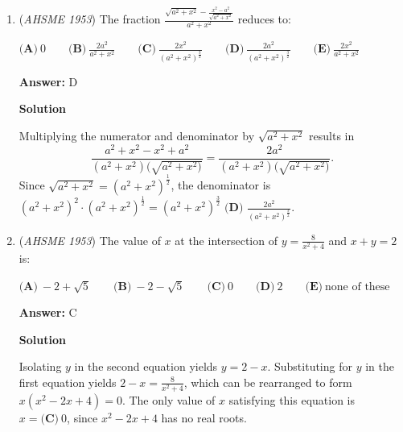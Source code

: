 \begin{enumerate}
 $\textbf{(A)}\ 10(q - 1) \qquad \textbf{(B)}\ \frac {2}{5}(4q - 4) \qquad \textbf{(C)}\ \frac {2}{5}(q - 1) \\  \textbf{(D)}\ \frac{5}{2}(q-1)\qquad \textbf{(E)}\ \text{none of these}$

 \textbf{Answer: }A



\textbf{Solution}

If Charles has $5q +1$ quarters and Richard has $q+5$ quarters, then the difference between them is  $4q-4$ quarters. Converting quarters to dimes, the difference between them is $\frac{5}{2}\cdot (4)(q-1)$, or $10(q-1)$ dimes, $\implies \fbox{A}$

 Note that $q$ does not stand for the number of quarters that they have.

 


	\item (\textit{AHSME 1953}) The fraction $\frac{\sqrt{a^2+x^2}-\frac{x^2-a^2}{\sqrt{a^2+x^2}}}{a^2+x^2}$ reduces to: 


 $\textbf{(A)}\ 0 \qquad \textbf{(B)}\ \frac{2a^2}{a^2+x^2} \qquad \textbf{(C)}\ \frac{2x^2}{(a^2+x^2)^{\frac{3}{2}}}\qquad \textbf{(D)}\ \frac{2a^2}{(a^2+x^2)^{\frac{3}{2}}}\qquad \textbf{(E)}\ \frac{2x^2}{a^2+x^2}$

 \textbf{Answer: }D



\textbf{Solution}

Multiplying the numerator and denominator by $\sqrt{a^2+x^2}$ results in 
 \[\frac{a^2+x^2-x^2+a^2}{(a^2+x^2)(\sqrt{a^2+x^2)}}=\frac{2a^2}{(a^2+x^2)(\sqrt{a^2+x^2)}}.\] Since $\sqrt{a^2+x^2}=(a^2+x^2)^{\frac{1}{2}}$, the denominator is $(a^2+x^2)^2\cdot (a^2+x^2)^{\frac{1}{2}} = (a^2+x^2)^{\frac{3}{2}}$ $\boxed{\textbf{(D) } \frac{2a^2}{(a^2+x^2)^{\frac{3}{2}}}}$.

 


	\item (\textit{AHSME 1953}) The value of $x$ at the intersection of $y=\frac{8}{x^2+4}$ and $x+y=2$ is: 


 $\textbf{(A)}\ -2+\sqrt{5} \qquad \textbf{(B)}\ -2-\sqrt{5} \qquad \textbf{(C)}\ 0 \qquad \textbf{(D)}\ 2 \qquad \textbf{(E)}\ \text{none of these}$

 \textbf{Answer: }C



\textbf{Solution}

Isolating $y$ in the second equation yields $y = 2-x$.  Substituting for $y$ in the first equation yields $2-x=\frac{8}{x^2+4}$, which can be rearranged to form $x(x^2-2x+4)=0$.  The only value of $x$ satisfying this equation is $x = \boxed{\textbf{(C)}\ 0}$, since $x^2-2x+4$ has no real roots.


\end{enumerate}
